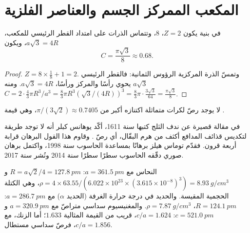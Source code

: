 \section{المكعب الممركز الجسم والعناصر الفلزية}

\begin{proposition}\label{prop:b1:crystals-metals:bcc}
في بنية  يكون $Z = 2$،  8، وتتماس الذرات
على امتداد القطر الرئيسي للمكعب، $a\sqrt3 = 4R$، ويكون
\[
  C = \frac{\pi\sqrt3}{8} \approx 0.68 .
\]
\end{proposition}

\begin{proof}
$Z = 8 \times \frac18 + 1 = 2$. وتمسّ الذرة المركزية الرؤوس
الثمانية: فالقطر الرئيسي $a\sqrt3$ يحوي رأسًا والمركز
ورأسًا، $a\sqrt3 = 4R$. ومنه $C = 2 \cdot \frac43\pi R^3/a^3 =
\frac83\pi R^3 (\sqrt3/(4R))^3 = \frac83\pi \cdot \frac{3\sqrt3}{64} =
\frac{\pi\sqrt3}{8}$.
\end{proof}

\begin{proposition}\label{prop:b1:crystals-metals:kepler}
لا يوجد رصّ لكرات متماثلة اكتنازه أكبر من
$\pi/(3\sqrt2) \approx 0.7405$، وهي قيمة  .
\end{proposition}
\admitted

\begin{history}
في مقالة قصيرة عن ندف الثلج كتبها سنة 1611، أكّد يوهانس كبلر
أنه لا توجد طريقة لتكديس قذائف المدافع أكثف من هرم
البقّال، أي رصّ . وقاوم هذا القول البرهان
قرابة أربعة قرون. فقدّم توماس هيلز برهانًا بمساعدة الحاسوب سنة
1998، واكتمل برهان صوري دقّقه الحاسوب سطرًا سطرًا سنة
2014 ونُشر سنة 2017.
\end{history}

\begin{example}\label{ex:b1:crystals-metals:metals}
النحاس  مع $a = \qty{361.5}{pm}$: $R = a\sqrt2/4 =
\qty{127.8}{pm}$ و$\rho = 4 \times 63.55/(6.022 \times 10^{23} \times
(3.615 \times 10^{-8})^3) = \qty{8.93}{g/cm^3}$، وهي الكتلة الحجمية المقيسة.
والحديد في درجة حرارة الغرفة (الحديد $\alpha$)  مع $a = \qty{286.7}{pm}$:
$R = \qty{124.1}{pm}$، $\rho = \qty{7.87}{g/cm^3}$. والمغنيسيوم سداسي متراصّ مع
$a = \qty{320.9}{pm}$ و$c = \qty{521.0}{pm}$: $c/a = 1.624$، قريب من
القيمة المثالية $1.633$؛ أما الزنك، مع $c/a = 1.856$، فرصّ سداسي
مستطال.
\end{example}

